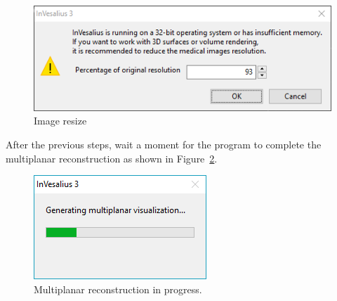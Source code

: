 \begin{figure}[!htb]
\centering
\includegraphics[scale=0.5]{../user_guide_figures/invesalius_screen/import_window_lower_memory_en.png}
\caption{Image resize}
\label{fig:import_bmp_resize_pt}
\end{figure}

After the previous steps, wait a moment for the program to complete the multiplanar reconstruction as shown in Figure~\ref{fig:import_bmp_mpr_pt.png}.

\begin{figure}[!htb]
\centering
\includegraphics[scale=0.6]{../user_guide_figures/invesalius_screen/import_window_progress_en.png}
\caption{Multiplanar reconstruction in progress.}
\label{fig:import_bmp_mpr_pt.png}
\end{figure}
